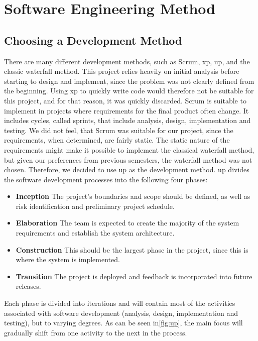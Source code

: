 \section{Software Engineering Method}
\label{sec:software_engineering_method}

\subsection{Choosing a Development Method}
There are many different development methods, such as Scrum, \ac{xp}, \ac{up}, and the classic waterfall method.
This project relies heavily on initial analysis before starting to design and implement, since the problem was not clearly defined from the beginning.
Using \ac{xp} to quickly write code would therefore not be suitable for this project, and for that reason, it was quickly discarded.
Scrum is suitable to implement in projects where requirements for the final product often change.
It includes cycles, called sprints, that include analysis, design, implementation and testing.
We did not feel, that Scrum was suitable for our project, since the requirements, when determined, are fairly static.
The static nature of the requirements might make it possible to implement the classical waterfall method, but given our preferences from previous semesters, the waterfall method was not chosen.
Therefore, we decided to use \ac{up} as the development method.
\ac{up} divides the software development processes into the following four phases: 

\begin{itemize}
\item \textbf{Inception} The project's boundaries and scope should be defined, as well as risk identification and preliminary project schedule.
\item \textbf{Elaboration} The team is expected to create the majority of the system requirements and establish the system architecture.
\item \textbf{Construction} This should be the largest phase in the project, since this is where the system is implemented.
\item \textbf{Transition} The project is deployed and feedback is incorporated into future releases.
\end{itemize}

Each phase is divided into iterations and will contain most of the activities associated with software development (analysis, design, implementation and testing), but to varying degrees. As can be seen in\autoref{fig:up}, the main focus will gradually shift from one activity to the next in the process.

